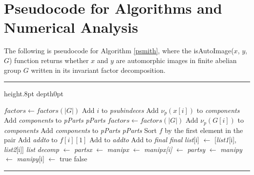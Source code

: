 \documentclass[11pt]{amsart}
\makeatletter
\theoremstyle{definition}
\newenvironment{breakablealgorithm}
  {%
   \begin{center}
     \refstepcounter{algorithm}%
     \hrule height.8pt depth0pt \kern2pt%
     \renewcommand{\caption}[2][\relax]{%
       {\raggedright\textbf{\fname@algorithm~\thealgorithm} ##2\par}%
       \ifx\relax##1\relax %
         \addcontentsline{loa}{algorithm}{\protect\numberline{\thealgorithm}##2}%
       \else %
         \addcontentsline{loa}{algorithm}{\protect\numberline{\thealgorithm}##1}%
       \fi
       \kern2pt\hrule\kern2pt
     }
  }{%
     \kern2pt\hrule\relax%
   \end{center}
  }
\numberwithin{equation}{section}
\makeatother
\begin{document}
\section{Pseudocode for Algorithms and Numerical Analysis}
The following is pseudocode for Algorithm \ref{psmith}, where the isAutoImage($x$, $y$, $G$) function returns whether $x$ and $y$ are automorphic images in finite abelian group $G$ written in its invariant factor decomposition. 
\newline
\begin{breakablealgorithm}
\begin{algorithmic}[1]
    \State $\textit{factors} \gets \textit{factors}(|G|)$
                \State Add $i$ to \textit{psubindeces}
            \EndIf
        \EndFor
            \State Add $\nu_p(x[i])$ to \textit{components}
        \EndFor
        \State Add \textit{components} to \textit{pParts}
    \EndFor
    \State \Return \textit{pParts}
\EndFunction
{}
    \State $\textit{factors} \gets \textit{factors}(|G|)$
                \State Add $\nu_p(G[i])$ to \textit{components}
            \EndIf
        \EndFor
        \State Add \textit{components} to \textit{pParts}
    \EndFor
    \State \Return \textit{pParts}
\EndFunction
{}
    \State Sort $f$ by the first element in the pair
\EndFunction
{}
    \State {}
        \State Add \textit{addto} to $f[i][1]$
        \State Add  to \textit{addto}
    \EndFor
        \State Add  to \textit{final}
    \EndFor
    \State \Return \textit{final}
\EndFunction
{}
        \State \textit{list}[i] $\gets$ [\textit{list1}[i], \textit{list2}[i]]
    \EndFor
    \State \Return \textit{list}
\EndFunction
{}
    \State \textit{decomp} $\gets$ 
    \State \textit{partsx} $\gets$ 
    \State \textit{manipx} $\gets$ 
        \State \textit{manipx[i]} $\gets$ 
    \EndFor
    \State \textit{partsy} $\gets$ 
    \State \textit{manipy} $\gets$ 
        \State \textit{manipy}[i] $\gets$ 
    \EndFor
        \State \Return true
    \EndIf
    \State \Return false
\EndFunction
\end{algorithmic}
\end{breakablealgorithm}
\end{document}

